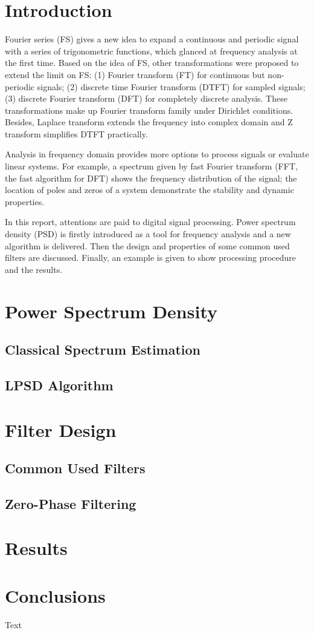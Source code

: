 \section{Introduction}


Fourier series (FS) gives a new idea to expand a continuous and periodic signal with a series of trigonometric functions, which glanced at frequency analysis at the first time. Based on the idea of FS, other transformations were proposed to extend the limit on FS: (1) Fourier transform (FT) for continuous but non-periodic signals; (2) discrete time Fourier transform (DTFT) for sampled signals; (3) discrete Fourier transform (DFT) for completely discrete analysis. These transformations make up Fourier transform family under Dirichlet conditions. Besides, Laplace transform extends the frequency into complex domain and Z transform simplifies DTFT practically.


Analysis in frequency domain provides more options to process signals or evaluate linear systems. For example, a spectrum given by fast Fourier transform (FFT, the fast algorithm for DFT) shows the frequency distribution of the signal; the location of poles and zeros of a system demonstrate the stability and dynamic properties.


In this report, attentions are paid to digital signal processing. Power spectrum density (PSD) is firstly introduced as a tool for frequency analysis and a new algorithm is delivered. Then the design and properties of some common used filters are discussed. Finally, an example is given to show processing procedure and the results.


\section{Power Spectrum Density} \label{sec:psd}
\subsection{Classical Spectrum Estimation}
\subsection{LPSD Algorithm}

\section{Filter Design} \label{sec:filter}
\subsection{Common Used Filters}

\subsection{Zero-Phase Filtering}

\section{Results}

\section{Conclusions}

Text



